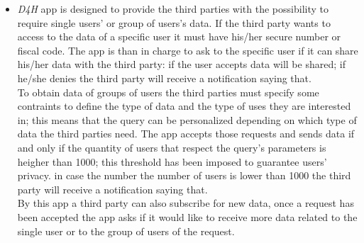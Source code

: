 \begin{itemize}
	\item{\textit{D4H} app is designed to provide the third parties with the possibility to require single users' or group of users's  				data.
		If the third party wants to access to the data of  a specific user it must have his/her secure number or fiscal code. 				The app is than in charge to ask to the specific user if it can share his/her data with the third party: if the user 					accepts data will be shared; if he/she denies the third party will receive a notification saying that.\\
		To obtain data of groups of users the third parties must specify some contraints to define the type of data and the type 			of uses they are interested in; this means that the query can be personalized depending on which type of data the third 			parties need. The app accepts those requests and sends data if and only if the quantity of users that respect the 				query's parameters is heigher than 1000; this threshold has been imposed to guarantee users' privacy. in case the number 			the number of users is lower than 1000 the third party will receive a notification saying that.\\
		By this app a third party can also subscribe for new data, once a request has been accepted the app asks if it would like to 			receive more data related to the single user or to the group of users of the request.}
		
\end{itemize}
